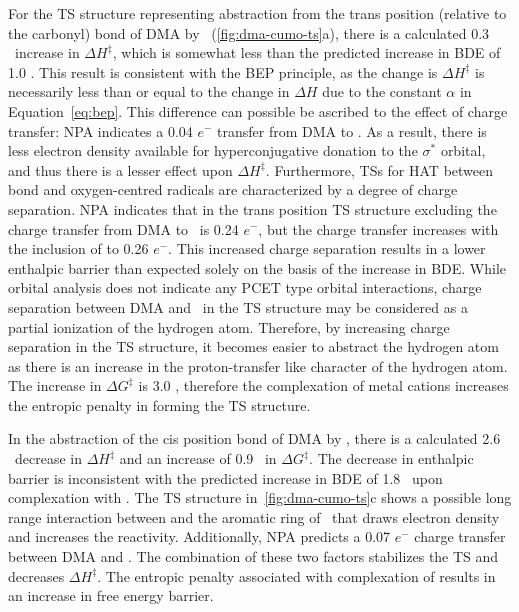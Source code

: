 For the TS structure representing abstraction from the trans position (relative
to the carbonyl)  bond of DMA by \cumo\ (\ref{fig:dma-cumo-ts}a), there
is a calculated 0.3 \kcalmol\ increase in $\Delta H^\ddagger$, which is somewhat
less than the predicted increase in BDE of 1.0 \kcalmol. This result is
consistent with the BEP principle, as the change is $\Delta H^\ddagger$ is
necessarily less than or equal to the change in $\Delta H$ due to the constant
$\alpha$ in Equation~\ref{eq:bep}. This difference can possible be ascribed to
the effect of charge transfer: NPA indicates a 0.04 $e^-$ transfer from DMA to
. As a result, there is less electron density available for
hyperconjugative donation to the  $\sigma^*$ orbital, and thus there is
a lesser effect upon $\Delta H^\ddagger$.  Furthermore, TSs for HAT between
 bond and oxygen-centred radicals are characterized by a degree of
charge separation.\cite{Roberts1999} NPA indicates that in the trans position TS
structure excluding  the charge transfer from DMA to \cumo\ is 0.24
$e^-$, but the charge transfer increases with the inclusion of  to 0.26
$e^-$. This increased charge separation results in a lower enthalpic barrier
than expected solely on the basis of the increase in  BDE. While orbital
analysis does not indicate any PCET type orbital interactions, charge separation
between DMA and \cumo\ in the TS structure may be considered as a partial
ionization of the hydrogen atom. Therefore, by increasing charge separation in
the TS structure, it becomes easier to abstract the hydrogen atom as there is an
increase in the proton-transfer like character of the hydrogen atom. The
increase in $\Delta G^\ddagger$ is 3.0 \kcalmol, therefore the complexation of
metal cations increases the entropic penalty in forming the TS structure.

In the abstraction of the cis position  bond of DMA by \cumo, there is a
calculated 2.6 \kcalmol\ decrease in $\Delta H^\ddagger$ and an increase of 0.9
\kcalmol\ in $\Delta G^\ddagger$. The decrease in enthalpic barrier is
inconsistent with the predicted increase in BDE of 1.8 \kcalmol\ upon
complexation with . The TS structure in~\ref{fig:dma-cumo-ts}c shows a
possible long range interaction between  and the aromatic ring of \cumo\
that draws electron density and increases the reactivity. Additionally, NPA
predicts a 0.07 $e^-$ charge transfer between DMA and \ch{Na}. The combination
of these two factors stabilizes the TS and decreases $\Delta H^\ddagger$. The
entropic penalty associated with complexation of \ch{NaCl} results in an
increase in free energy barrier.

